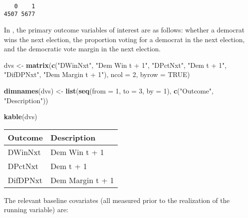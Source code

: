 \documentclass[
  12pt,
  leqno]{article}
\newenvironment{Shaded}{\begin{snugshade}}{\end{snugshade}}
\newcommand{\AttributeTok}[1]{\textcolor[rgb]{0.13,0.29,0.53}{#1}}
\newcommand{\ConstantTok}[1]{\textcolor[rgb]{0.56,0.35,0.01}{#1}}
\newcommand{\DecValTok}[1]{\textcolor[rgb]{0.00,0.00,0.81}{#1}}
\newcommand{\FunctionTok}[1]{\textcolor[rgb]{0.13,0.29,0.53}{\textbf{#1}}}
\newcommand{\NormalTok}[1]{#1}
\newcommand{\OtherTok}[1]{\textcolor[rgb]{0.56,0.35,0.01}{#1}}
\newcommand{\StringTok}[1]{\textcolor[rgb]{0.31,0.60,0.02}{#1}}
\begin{document}
\begin{verbatim}

   0    1 
4507 5677 
\end{verbatim}

\normalsize

In \citet{caugheysekhon2011}, the primary outcome variables of interest
are as follows: whether a democrat wins the next election, the
proportion voting for a democrat in the next election, and the
democratic vote margin in the next election.

\scriptsize

\begin{Shaded}
\begin{Highlighting}[]
\NormalTok{dvs }\OtherTok{\textless{}{-}} \FunctionTok{matrix}\NormalTok{(}\FunctionTok{c}\NormalTok{(}\StringTok{"DWinNxt"}\NormalTok{, }\StringTok{"Dem Win t + 1"}\NormalTok{, }\StringTok{"DPctNxt"}\NormalTok{, }\StringTok{"Dem t + 1"}\NormalTok{, }\StringTok{"DifDPNxt"}\NormalTok{, }\StringTok{"Dem Margin t + 1"}\NormalTok{),}
    \AttributeTok{ncol =} \DecValTok{2}\NormalTok{, }\AttributeTok{byrow =} \ConstantTok{TRUE}\NormalTok{)}

\FunctionTok{dimnames}\NormalTok{(dvs) }\OtherTok{\textless{}{-}} \FunctionTok{list}\NormalTok{(}\FunctionTok{seq}\NormalTok{(}\AttributeTok{from =} \DecValTok{1}\NormalTok{, }\AttributeTok{to =} \DecValTok{3}\NormalTok{, }\AttributeTok{by =} \DecValTok{1}\NormalTok{), }\FunctionTok{c}\NormalTok{(}\StringTok{"Outcome"}\NormalTok{, }\StringTok{"Description"}\NormalTok{))}

\FunctionTok{kable}\NormalTok{(dvs)}
\end{Highlighting}
\end{Shaded}

\begin{longtable}[]{@{}ll@{}}
\toprule\noalign{}
Outcome & Description \\
\midrule\noalign{}
\endhead
\bottomrule\noalign{}
\endlastfoot
DWinNxt & Dem Win t + 1 \\
DPctNxt & Dem t + 1 \\
DifDPNxt & Dem Margin t + 1 \\
\end{longtable}

\normalsize

The relevant baseline covariates (all measured prior to the realization
of the running variable) are:

\scriptsize
\end{document}
